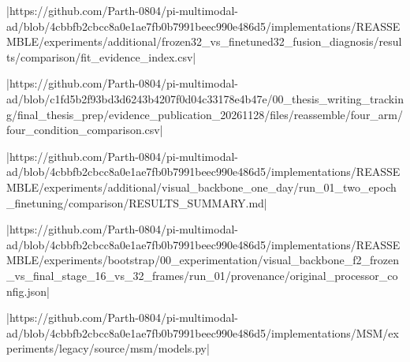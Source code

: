 |https://github.com/Parth-0804/pi-multimodal-ad/blob/4cbbfb2cbcc8a0e1ae7fb0b7991beec990e486d5/implementations/REASSEMBLE/experiments/additional/frozen32_vs_finetuned32_fusion_diagnosis/results/comparison/fit_evidence_index.csv|

|https://github.com/Parth-0804/pi-multimodal-ad/blob/c1fd5b2f93bd3d6243b4207f0d04c33178e4b47e/00_thesis_writing_tracking/final_thesis_prep/evidence_publication_20261128/files/reassemble/four_arm/four_condition_comparison.csv|

|https://github.com/Parth-0804/pi-multimodal-ad/blob/4cbbfb2cbcc8a0e1ae7fb0b7991beec990e486d5/implementations/REASSEMBLE/experiments/additional/visual_backbone_one_day/run_01_two_epoch_finetuning/comparison/RESULTS_SUMMARY.md|

|https://github.com/Parth-0804/pi-multimodal-ad/blob/4cbbfb2cbcc8a0e1ae7fb0b7991beec990e486d5/implementations/REASSEMBLE/experiments/bootstrap/00_experimentation/visual_backbone_f2_frozen_vs_final_stage_16_vs_32_frames/run_01/provenance/original_processor_config.json|

|https://github.com/Parth-0804/pi-multimodal-ad/blob/4cbbfb2cbcc8a0e1ae7fb0b7991beec990e486d5/implementations/MSM/experiments/legacy/source/msm/models.py|

